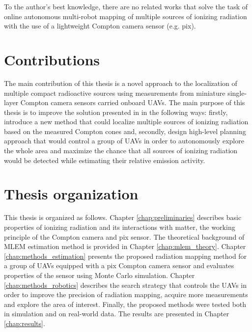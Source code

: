 To the author's best knowledge, there are no related works that solve the task of online autonomous multi-robot mapping of multiple sources of ionizing radiation with the use of a lightweight Compton camera sensor (e.g. \ac{pix}).

\section{Contributions}
The main contribution of this thesis is a novel approach to the localization of multiple compact radioactive sources using measurements from miniature single-layer Compton camera sensors carried onboard \acp{UAV}.
The main purpose of this thesis is to improve the solution presented in \cite{baca2021gamma} in the following ways: 
firstly, introduce a new method that could localize multiple sources of ionizing radiation based on the measured Compton cones and, 
secondly, 
design high-level planning approach that would control a group of \ac{UAV}s in order to autonomously explore the whole area and maximize the chance that all sources of ionizing radiation would be detected while estimating their relative emission activity.

\section{Thesis organization}
This thesis is organized as follows.
Chapter \ref{chap:preliminaries} describes basic properties of ionizing radiation and its interactions with matter, the working principle of the Compton camera and \ac{pix} sensor.
The theoretical background of \ac{MLEM} estimation method is provided in Chapter \ref{chap:mlem_theory}.
Chapter \ref{chap:methods_estimation} presents the proposed radiation mapping method for a group of \ac{UAV}s equipped with a \ac{pix} Compton camera sensor and evaluates properties of the sensor using Monte Carlo simulation.
Chapter \ref{chap:methods_robotics} describes the search strategy that controls the \ac{UAV}s in order to improve the precision of radiation mapping, acquire more measurements and explore the area of interest. 
Finally, the proposed methods were tested both in simulation and on real-world data. 
The results are presented in Chapter \ref{chap:results}.



